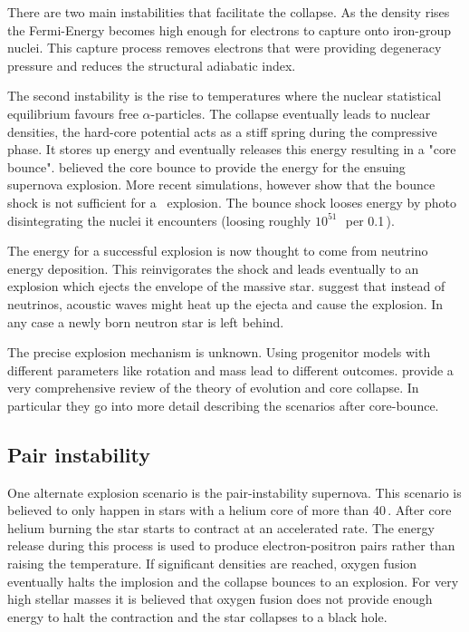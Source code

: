 There are two main instabilities that facilitate the collapse. As the density rises the Fermi-Energy becomes high enough for electrons to capture onto iron-group nuclei. This capture process removes electrons that were providing degeneracy pressure and reduces the structural adiabatic index. 

The second instability is the rise to temperatures where the nuclear statistical equilibrium favours free $\alpha$-particles. The collapse eventually leads to nuclear densities, the hard-core potential acts as a stiff spring during the compressive phase. It stores up energy and eventually releases this energy resulting in a "core bounce".  
\citet{1985PhRvL..55..126B,1987PhRvL..59..736B} believed the core bounce to provide the energy for the ensuing supernova explosion. More recent simulations, however show that the bounce shock is not sufficient for a \snii\ explosion. The bounce shock looses energy by photo disintegrating the nuclei it encounters (loosing roughly $10^{51}$\,\erg\ per 0.1\,\msun).

The energy for a successful explosion is now thought to come from neutrino energy deposition. This reinvigorates the shock and leads eventually to an explosion which ejects the envelope of the massive star. \cite{2007ApJ...655..416B} suggest that instead of neutrinos, acoustic waves might heat up the ejecta and cause the explosion. In any case a newly born neutron star is left behind.

The precise explosion mechanism is unknown. Using progenitor models with different parameters like rotation and mass lead to different outcomes. \citet{2002RvMP...74.1015W} provide a very comprehensive review of the theory of evolution and core collapse. In particular they go into more detail describing the scenarios after core-bounce.

\subsection{Pair instability}
One alternate explosion scenario is the pair-instability supernova. This scenario is believed to only happen in stars with a helium core of more than 40\,\msun. After core helium burning the star starts to contract at an accelerated rate. The energy release during this process is used to produce electron-positron pairs rather than raising the temperature. If significant densities are reached, oxygen fusion eventually halts the implosion and the collapse bounces to an explosion. For very high stellar masses it is believed that oxygen fusion does not provide enough energy to halt the contraction and the star collapses to a black hole.


